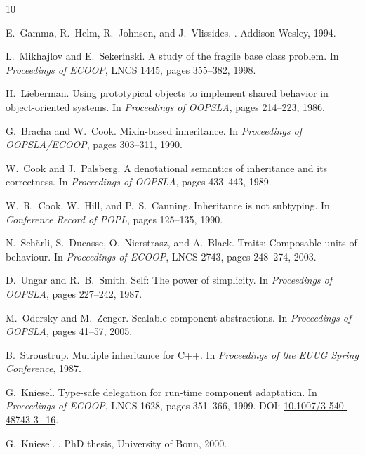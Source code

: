 \documentclass[acmsmall,nonacm]{acmart}
\theoremstyle{acmplain}
\theoremstyle{acmdefinition}
\begin{document}
\begin{thebibliography}{10}

E.~Gamma, R.~Helm, R.~Johnson, and J.~Vlissides.
.
\newblock Addison-Wesley, 1994.

L.~Mikhajlov and E.~Sekerinski.
\newblock A study of the fragile base class problem.
\newblock In {\em Proceedings of ECOOP}, LNCS 1445, pages 355--382, 1998.

H.~Lieberman.
\newblock Using prototypical objects to implement shared behavior in
  object-oriented systems.
\newblock In {\em Proceedings of OOPSLA}, pages 214--223, 1986.

G.~Bracha and W.~Cook.
\newblock Mixin-based inheritance.
\newblock In {\em Proceedings of OOPSLA/ECOOP}, pages 303--311, 1990.

W.~Cook and J.~Palsberg.
\newblock A denotational semantics of inheritance and its correctness.
\newblock In {\em Proceedings of OOPSLA}, pages 433--443, 1989.

W.~R.~Cook, W.~Hill, and P.~S.~Canning.
\newblock Inheritance is not subtyping.
\newblock In {\em Conference Record of POPL}, pages 125--135, 1990.

N.~Sch{\"a}rli, S.~Ducasse, O.~Nierstrasz, and A.~Black.
\newblock Traits: Composable units of behaviour.
\newblock In {\em Proceedings of ECOOP}, LNCS 2743, pages 248--274, 2003.

D.~Ungar and R.~B.~Smith.
\newblock Self: The power of simplicity.
\newblock In {\em Proceedings of OOPSLA}, pages 227--242, 1987.

M.~Odersky and M.~Zenger.
\newblock Scalable component abstractions.
\newblock In {\em Proceedings of OOPSLA}, pages 41--57, 2005.

B.~Stroustrup.
\newblock Multiple inheritance for {C++}.
\newblock In {\em Proceedings of the EUUG Spring Conference}, 1987.

G.~Kniesel.
\newblock Type-safe delegation for run-time component adaptation.
\newblock In {\em Proceedings of ECOOP}, LNCS 1628, pages 351--366, 1999.
\newblock DOI: \href{https://doi.org/10.1007/3-540-48743-3_16}{10.1007/3-540-48743-3\_16}.

G.~Kniesel.
.
\newblock PhD thesis, University of Bonn, 2000.


\end{thebibliography}
\end{document}
